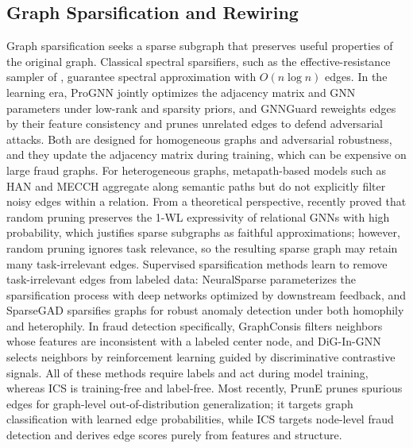 \documentclass[11pt]{article}
\begin{document}
\subsection{Graph Sparsification and Rewiring}

Graph sparsification seeks a sparse subgraph that preserves useful properties of the original graph. Classical spectral sparsifiers, such as the effective-resistance sampler of \cite{spielman2011spectral}, guarantee spectral approximation with $O(n\log n)$ edges. In the learning era, ProGNN \cite{jin2020prognn} jointly optimizes the adjacency matrix and GNN parameters under low-rank and sparsity priors, and GNNGuard \cite{zhang2020gnnguard} reweights edges by their feature consistency and prunes unrelated edges to defend adversarial attacks. Both are designed for homogeneous graphs and adversarial robustness, and they update the adjacency matrix during training, which can be expensive on large fraud graphs. For heterogeneous graphs, metapath-based models such as HAN \cite{wang2019han} and MECCH \cite{huang2022mecch} aggregate along semantic paths but do not explicitly filter noisy edges within a relation. From a theoretical perspective, \cite{kummer2026lottery} recently proved that random pruning preserves the 1-WL expressivity of relational GNNs with high probability, which justifies sparse subgraphs as faithful approximations; however, random pruning ignores task relevance, so the resulting sparse graph may retain many task-irrelevant edges. Supervised sparsification methods learn to remove task-irrelevant edges from labeled data: NeuralSparse \cite{zheng2020neuralsparse} parameterizes the sparsification process with deep networks optimized by downstream feedback, and SparseGAD \cite{gong2023sparsegad} sparsifies graphs for robust anomaly detection under both homophily and heterophily. In fraud detection specifically, GraphConsis \cite{liu2020graphconsis} filters neighbors whose features are inconsistent with a labeled center node, and DiG-In-GNN \cite{zhang2024digin} selects neighbors by reinforcement learning guided by discriminative contrastive signals. All of these methods require labels and act during model training, whereas ICS is training-free and label-free. Most recently, PrunE \cite{yao2025prune} prunes spurious edges for graph-level out-of-distribution generalization; it targets graph classification with learned edge probabilities, while ICS targets node-level fraud detection and derives edge scores purely from features and structure.
\end{document}
